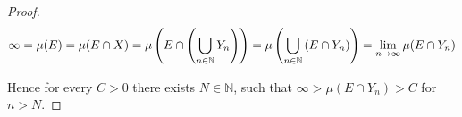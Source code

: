 \documentclass[11pt,oneside,a4paper,final]{amsart}
\theoremstyle{bold}
\begin{document}
\begin{appendix}
\begin{proof}
        \begin{equation*}
            \infty = \mu(E) = \mu(E \cap X) = \mu\del[4]{E \cap \del[4]{\bigcup_{n \in \mathbb{N}} Y_n}} = \mu\del[4]{\bigcup_{n \in \mathbb{N}} \del[0]{ E \cap Y_n}} = \lim\limits_{n \rightarrow \infty} \mu( E \cap Y_n )
        \end{equation*}

        Hence for every $C > 0$ there exists $N \in \mathbb{N}$, such that $\infty > \mu(E \cap Y_n) > C$ for $n > N$.
    \end{proof}

\end{appendix}

\printbibliography
\end{document}
